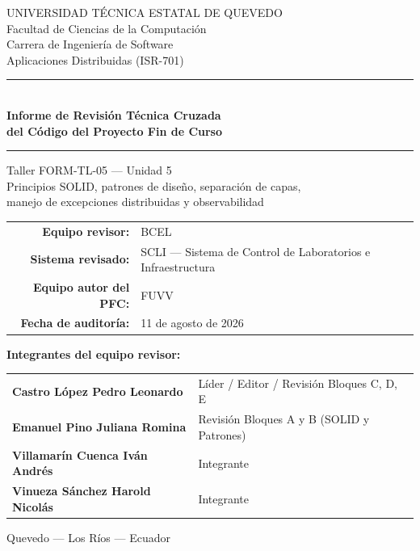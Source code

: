 \documentclass[11pt,a4paper]{article}
\begin{document}
\begin{titlepage}
\begin{center}

\vspace*{1cm}

{\large UNIVERSIDAD TÉCNICA ESTATAL DE QUEVEDO}\\[0.2cm]
{\normalsize Facultad de Ciencias de la Computación}\\
{\normalsize Carrera de Ingeniería de Software}\\
{\normalsize Aplicaciones Distribuidas (ISR-701)}

\vspace{2cm}

\rule{\linewidth}{0.4pt}\\[0.4cm]
{\huge \bfseries Informe de Revisión Técnica Cruzada}\\[0.3cm]
{\large \bfseries del Código del Proyecto Fin de Curso}\\[0.4cm]
\rule{\linewidth}{0.4pt}

\vspace{0.8cm}
{\normalsize Taller FORM-TL-05 — Unidad 5\\
Principios SOLID, patrones de diseño, separación de capas,\\
manejo de excepciones distribuidas y observabilidad}

\vspace{2cm}

\begin{tabular}{r l}
\textbf{Equipo revisor:} & BCEL \\
\textbf{Sistema revisado:} & SCLI — Sistema de Control de Laboratorios e Infraestructura \\
\textbf{Equipo autor del PFC:} & FUVV \\
\textbf{Fecha de auditoría:} & 11 de agosto de 2026 \\
\end{tabular}

\vfill

\textbf{Integrantes del equipo revisor:}\\[0.3cm]
\begin{tabular}{l l}
\textbf{Castro López Pedro Leonardo} & Líder / Editor / Revisión Bloques C, D, E \\
\textbf{Emanuel Pino Juliana Romina} & Revisión Bloques A y B (SOLID y Patrones) \\
\textbf{Villamarín Cuenca Iván Andrés} & Integrante \\
\textbf{Vinueza Sánchez Harold Nicolás} & Integrante \\
\end{tabular}

\vspace{1cm}
{\small Quevedo — Los Ríos — Ecuador}

\end{center}
\end{titlepage}
\end{document}

